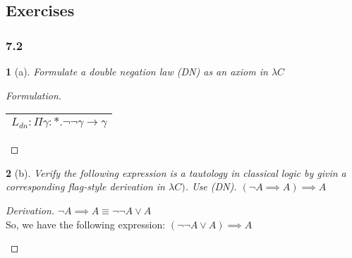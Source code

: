 \documentclass[12pt, a4paper]{article}
\newtheorem*{exercise}{}
\begin{document}
\begin{flagderiv}
    \caption{A derivation of $\neg \exists_{x \in S}(P(x)) \implies \forall_{y \in S}(\neg P(y))$}
\end{flagderiv}

\subsection{Exercises}
\subsubsection{7.2}
\begin{exercise}[a]
    Formulate a double negation law (DN) as an axiom in $\lambda C$
\end{exercise}
\begin{proof}[Formulation]
    \begin{tabular}[]{|c|}
        \hline
        $L_{dn} : \Pi \gamma : *. \neg\neg\gamma \to \gamma$\\
        \hline
    \end{tabular}
\end{proof}

\begin{exercise}[b]
    Verify the following expression is a tautology in classical logic by givin a corresponding flag-style derivation in $\lambda C)$. Use (DN). $(\neg A \implies A) \implies A$
\end{exercise}
\begin{proof}[Derivation]
    $\neg A \implies A \equiv \neg \neg A \lor A$\\
    So, we have the following expression: $(\neg \neg A \lor A) \implies A$

    \begin{flagderiv}
    \end{flagderiv}
\end{proof}
\end{document}
